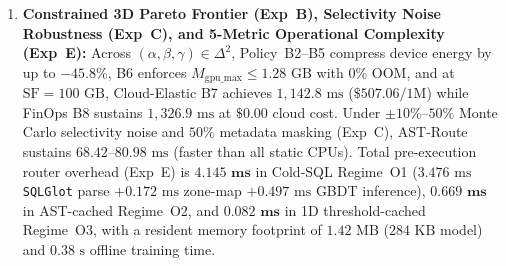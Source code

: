 \documentclass[10pt,a4paper]{article}
\begin{document}
\begin{enumerate}[leftmargin=1.5em,itemsep=1pt]
    \item \textbf{Constrained 3D Pareto Frontier (Exp~B), Selectivity Noise Robustness (Exp~C), and 5-Metric Operational Complexity (Exp~E):} Across $(\alpha,\beta,\gamma)\in\Delta^2$, Policy~B2--B5 compress device energy by up to $-45.8\%$, B6 enforces $M_{\text{gpu\_max}}\le 1.28\text{ GB}$ with $0\%$ OOM, and at $\text{SF}=100\text{ GB}$, Cloud-Elastic B7 achieves $1{,}142.8\text{ ms}$ ($\$507.06/1\text{M}$) while FinOps B8 sustains $1{,}326.9\text{ ms}$ at $\$0.00$ cloud cost. Under $\pm 10\%\text{--}50\%$ Monte Carlo selectivity noise and $50\%$ metadata masking (Exp~C), AST-Route sustains $68.42\text{--}80.98\text{ ms}$ (faster than all static CPUs). Total pre-execution router overhead (Exp~E) is $\mathbf{4.145\text{ ms}}$ in Cold-SQL Regime~O1 ($3.476\text{ ms}$ \texttt{SQLGlot} parse $+ 0.172\text{ ms}$ zone-map $+ 0.497\text{ ms}$ GBDT inference), $\mathbf{0.669\text{ ms}}$ in AST-cached Regime~O2, and $\mathbf{0.082\text{ ms}}$ in 1D threshold-cached Regime~O3, with a resident memory footprint of $1.42\text{ MB}$ ($284\text{ KB}$ model) and $0.38\text{ s}$ offline training time.
\end{enumerate}
\end{document}

